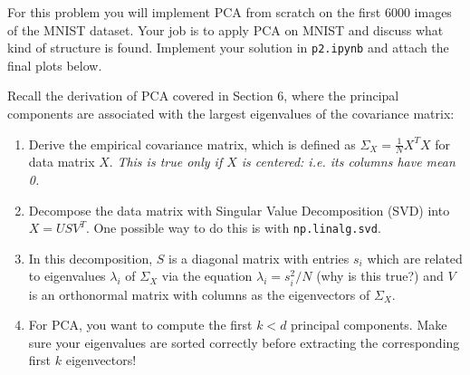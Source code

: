 \documentclass[submit]{harvardml}
\begin{document}
\begin{problem}

% 
% 

  
For this problem you will implement PCA from scratch on the first 6000 images of the MNIST dataset. Your job is to apply PCA on MNIST and discuss what kind of structure is found. Implement your solution in \texttt{p2.ipynb} and attach the final plots below.

Recall the derivation of PCA covered in Section 6, where the principal components are associated with the largest eigenvalues of the covariance matrix: 

\begin{enumerate}[label=(\alph*)]
    \item Derive the empirical covariance matrix, which is defined as $\Sigma_X = \frac{1}{N}X^TX$ for data matrix $X$. \textit{This is true only if $X$ is centered: i.e. its columns have mean 0.}
    \item Decompose the data matrix with Singular Value Decomposition (SVD) into $X = USV^T$. One possible way to do this is with {\normalfont \texttt{np.linalg.svd}}.
    \item In this decomposition, $S$ is a diagonal matrix with entries $s_{i}$ which are related to eigenvalues $\lambda_{i}$ of $\Sigma_X$ via the equation $\lambda_i = s_i^2/N$ (why is this true?) and $V$ is an orthonormal matrix with columns as the eigenvectors of $\Sigma_X$.
    \item For PCA, you want to compute the first $k < d$ principal components. Make sure your eigenvalues are sorted correctly before extracting the corresponding first $k$ eigenvectors!
\end{enumerate}


\end{problem}
\end{document}

